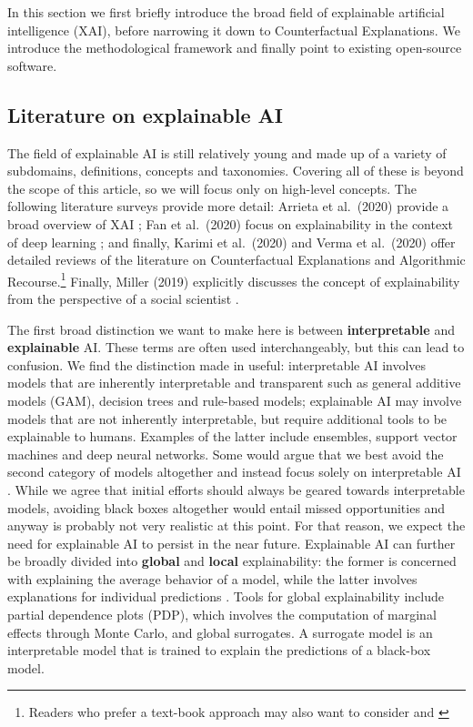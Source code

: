 \documentclass[
  letterpaper,
  DIV=11,
  numbers=noendperiod]{scrartcl}
\begin{document}
In this section we first briefly introduce the broad field of
explainable artificial intelligence (XAI), before narrowing it down to
Counterfactual Explanations. We introduce the methodological framework
and finally point to existing open-source software.

\hypertarget{literature-on-explainable-ai}{%
\subsection{Literature on explainable
AI}\label{literature-on-explainable-ai}}

The field of explainable AI is still relatively young and made up of a
variety of subdomains, definitions, concepts and taxonomies. Covering
all of these is beyond the scope of this article, so we will focus only
on high-level concepts. The following literature surveys provide more
detail: Arrieta et al.~(2020) provide a broad overview of XAI
\cite{arrieta2020explainable}; Fan et al.~(2020) focus on explainability
in the context of deep learning \cite{fan2020interpretability}; and
finally, Karimi et al.~(2020) \cite{karimi2020survey} and Verma et
al.~(2020) \cite{verma2020counterfactual} offer detailed reviews of the
literature on Counterfactual Explanations and Algorithmic
Recourse.\footnote{Readers who prefer a text-book approach may also want
  to consider \cite{molnar2020interpretable} and
  \cite{varshney2022trustworthy}} Finally, Miller (2019) explicitly
discusses the concept of explainability from the perspective of a social
scientist \cite{miller2019explanation}.

The first broad distinction we want to make here is between
\textbf{interpretable} and \textbf{explainable} AI. These terms are
often used interchangeably, but this can lead to confusion. We find the
distinction made in \cite{rudin2019stop} useful: interpretable AI
involves models that are inherently interpretable and transparent such
as general additive models (GAM), decision trees and rule-based models;
explainable AI may involve models that are not inherently interpretable,
but require additional tools to be explainable to humans. Examples of
the latter include ensembles, support vector machines and deep neural
networks. Some would argue that we best avoid the second category of
models altogether and instead focus solely on interpretable AI
\cite{rudin2019stop}. While we agree that initial efforts should always
be geared towards interpretable models, avoiding black boxes altogether
would entail missed opportunities and anyway is probably not very
realistic at this point. For that reason, we expect the need for
explainable AI to persist in the near future. Explainable AI can further
be broadly divided into \textbf{global} and \textbf{local}
explainability: the former is concerned with explaining the average
behavior of a model, while the latter involves explanations for
individual predictions \cite{molnar2020interpretable}. Tools for global
explainability include partial dependence plots (PDP), which involves
the computation of marginal effects through Monte Carlo, and global
surrogates. A surrogate model is an interpretable model that is trained
to explain the predictions of a black-box model.
\end{document}
